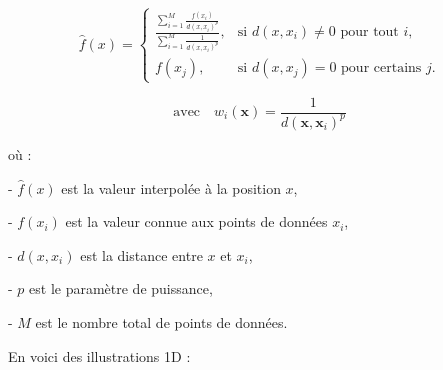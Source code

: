 \begin{equation}
    \hat{f}(x) = 
    \begin{cases}
    \frac{\sum_{i=1}^{M} \frac{f(x_i)}{d(x, x_i)^p}}{\sum_{i=1}^{M} \frac{1}{d(x, x_i)^p}}, & \text{si } d(x, x_i) \neq 0 \text{ pour tout } i, \\ 
    f(x_j), & \text{si } d(x, x_j) = 0 \text{ pour certains } j.
    \end{cases}
\end{equation}


\[
\text{avec} \quad w_i(\mathbf{x}) = \frac{1}{d(\mathbf{x}, \mathbf{x}_i)^p}
\]


où :

- \(\hat{f}(x)\) est la valeur interpolée à la position \(x\),

- \(f(x_i)\) est la valeur connue aux points de données \(x_i\),

- \(d(x, x_i)\) est la distance entre \(x\) et \(x_i\),

- \(p\) est le paramètre de puissance,

- \(M\) est le nombre total de points de données.


En voici des illustrations 1D :

